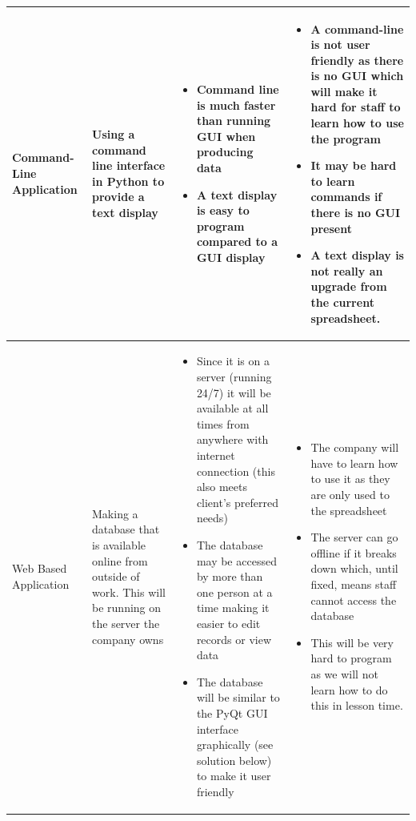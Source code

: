 \begin{center}
\begin{longtable}{|p{2.5cm}|p{3cm}|p{3.2cm}|p{3.2cm}|}
Command-Line Application &		 Using a command line interface in Python to provide a text display & 		\begin{itemize} \item Command line is much faster than running GUI when producing data \item A text display is easy to program compared to a GUI display \end{itemize} & 		\begin{itemize} \item A command-line is not user friendly as there is no GUI which will make it hard for staff to learn how to use the program \item It may be hard to learn commands if there is no GUI present \item A text display is not really an upgrade from the current spreadsheet. \end{itemize} \\ \hline
Web Based Application &		Making a database that is available online from outside of work. This will be running on the server the company owns  & 		\begin{itemize} \item Since it is on a server (running 24/7) it will be available at all times from anywhere with internet connection (this also meets client's preferred needs) \item The database may be accessed by more than one person at a time making it easier to edit records or view data \item The database will be similar to the PyQt GUI interface graphically (see solution below) to make it user friendly  \end{itemize} & 		 \begin{itemize} \item The company will have to learn how to use it as they are only used to the spreadsheet \item The server can go offline if it breaks down which, until fixed, means staff cannot access the database \item This will be very hard to program as we will not learn how to do this in lesson time. \end{itemize} \\ \hline

\end{longtable}
\end{center}
